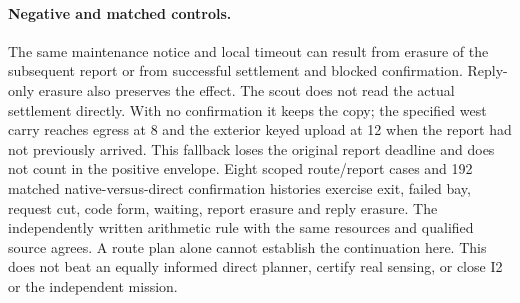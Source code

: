 \documentclass[11pt]{article}
\begin{document}
\paragraph{Negative and matched controls.}
The same maintenance notice and local timeout can result
from erasure of the subsequent report or from successful
settlement and blocked confirmation. Reply-only erasure
also preserves the effect. The scout does not read the
actual settlement directly. With no confirmation it keeps
the copy; the specified west carry reaches egress at 8
and the exterior keyed upload at 12 when the report had
not previously arrived. This fallback loses the original
report deadline and does not count in the positive envelope.
Eight scoped route/report cases and 192 matched
native-versus-direct confirmation histories exercise exit,
failed bay, request cut, code form, waiting, report erasure
and reply erasure. The independently written arithmetic rule
with the same resources and qualified source agrees.
A route plan alone cannot establish the continuation here.
This does not beat an equally informed direct planner,
certify real sensing, or close I2 or the independent mission.
\end{document}

